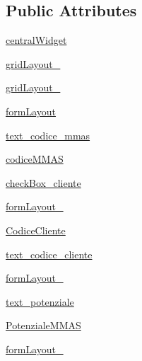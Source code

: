 \subsection*{Public Attributes}
\begin{DoxyCompactItemize}
\item 
\hyperlink{classmmasgis_1_1Ui__anagrafica_1_1Ui__MainWindowAnagrafica_a779fa054a9111c3a8ab9217e8fa77560}{centralWidget}
\item 
\hyperlink{classmmasgis_1_1Ui__anagrafica_1_1Ui__MainWindowAnagrafica_af08bd74b4eaa7e245fbad45e15d96ef8}{gridLayout\_}
\item 
\hyperlink{classmmasgis_1_1Ui__anagrafica_1_1Ui__MainWindowAnagrafica_a6f899754e9c97d7562116d6f44cf4154}{gridLayout\_}
\item 
\hyperlink{classmmasgis_1_1Ui__anagrafica_1_1Ui__MainWindowAnagrafica_ae4abe2497be43f5e24dd1b1adc647628}{formLayout}
\item 
\hyperlink{classmmasgis_1_1Ui__anagrafica_1_1Ui__MainWindowAnagrafica_ac965c0c14b60d511d3d88328696925c6}{text\_\-codice\_\-mmas}
\item 
\hyperlink{classmmasgis_1_1Ui__anagrafica_1_1Ui__MainWindowAnagrafica_a0c93c9cc8ac8c75467b6892590164132}{codiceMMAS}
\item 
\hyperlink{classmmasgis_1_1Ui__anagrafica_1_1Ui__MainWindowAnagrafica_a3143cf15d42e434d54854f2bdb475a07}{checkBox\_\-cliente}
\item 
\hyperlink{classmmasgis_1_1Ui__anagrafica_1_1Ui__MainWindowAnagrafica_aa1fab8bd49f16f65a8dd0a850ca6c25e}{formLayout\_}
\item 
\hyperlink{classmmasgis_1_1Ui__anagrafica_1_1Ui__MainWindowAnagrafica_a58b53c79ef328d7f924198985767b9a3}{CodiceCliente}
\item 
\hyperlink{classmmasgis_1_1Ui__anagrafica_1_1Ui__MainWindowAnagrafica_a80c5ca7e456414ec4c87841d9fc279b8}{text\_\-codice\_\-cliente}
\item 
\hyperlink{classmmasgis_1_1Ui__anagrafica_1_1Ui__MainWindowAnagrafica_a665b2beebb8b40e2845eedf68688e5a6}{formLayout\_}
\item 
\hyperlink{classmmasgis_1_1Ui__anagrafica_1_1Ui__MainWindowAnagrafica_a3dad3cf66efac3a68b8002d7d2ffa73f}{text\_\-potenziale}
\item 
\hyperlink{classmmasgis_1_1Ui__anagrafica_1_1Ui__MainWindowAnagrafica_ae0dce28a8b0db8f7b2058b388f83d0fc}{PotenzialeMMAS}
\item 
\hyperlink{classmmasgis_1_1Ui__anagrafica_1_1Ui__MainWindowAnagrafica_a09174dc6fad5e8b0ceb3d9078abba655}{formLayout\_}

\end{DoxyCompactItemize}
